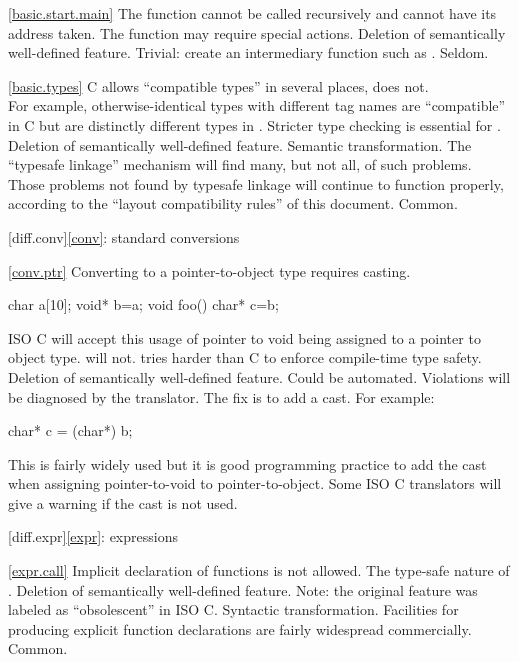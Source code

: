 \ref{basic.start.main}
\change The  function cannot be called recursively and cannot have its address taken.
\rationale
The  function may require special actions.
\effect
Deletion of semantically well-defined feature.
\difficulty
Trivial: create an intermediary function such as
.
\howwide
Seldom.

\ref{basic.types}
\change C allows ``compatible types'' in several places, \Cpp does not.\\
For example,
otherwise-identical  types with different tag names
are ``compatible'' in C but are distinctly different types
in \Cpp.
\rationale
Stricter type checking is essential for \Cpp.
\effect
Deletion of semantically well-defined feature.
\difficulty
Semantic transformation.
The ``typesafe linkage'' mechanism will find many, but not all,
of such problems.
Those problems not found by typesafe linkage will continue to
function properly,
according to the ``layout compatibility rules'' of this
document.
\howwide
Common.

[diff.conv]{\ref{conv}: standard conversions}

\ref{conv.ptr}
\change Converting  to a pointer-to-object type requires casting.

\begin{codeblock}
char a[10];
void* b=a;
void foo() {
  char* c=b;
}
\end{codeblock}

ISO C will accept this usage of pointer to void being assigned
to a pointer to object type.
\Cpp will not.
\rationale
\Cpp tries harder than C to enforce compile-time type safety.
\effect
Deletion of semantically well-defined feature.
\difficulty
Could be automated.
Violations will be diagnosed by the \Cpp translator.
The
fix is to add a  cast.
For example:

\begin{codeblock}
char* c = (char*) b;
\end{codeblock}

\howwide
This is fairly widely used but it is good
programming practice to add the cast when assigning pointer-to-void to pointer-to-object.
Some ISO C translators will give a warning
if the cast is not used.

[diff.expr]{\ref{expr}: expressions}

\ref{expr.call}
\change Implicit declaration of functions is not allowed.
\rationale
The type-safe nature of \Cpp.
\effect
Deletion of semantically well-defined feature.
Note: the original feature was labeled as ``obsolescent'' in ISO C.
\difficulty
Syntactic transformation.
Facilities for producing explicit function declarations are fairly
widespread commercially.
\howwide
Common.

